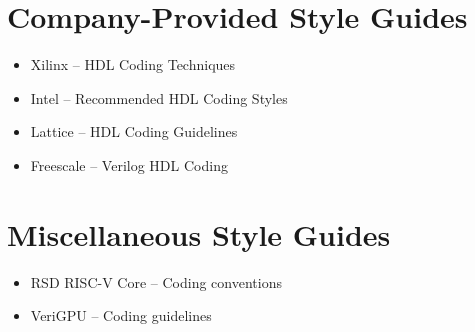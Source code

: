 \begin{appendices}
\section{Company-Provided Style Guides}

\begin{itemize}
    \item Xilinx -- HDL Coding Techniques \cite{Xilinxstyleguide}
    \item Intel -- Recommended HDL Coding Styles \cite{Intelstyleguide}
    \item Lattice -- HDL Coding Guidelines \cite{Latticestyleguide}
    \item Freescale -- Verilog HDL Coding \cite{Freescalestyleguide}
\end{itemize}

\section{Miscellaneous Style Guides}

\begin{itemize}
    \item RSD RISC-V Core -- Coding conventions \cite{RSDstyleguide}
    \item VeriGPU -- Coding guidelines \cite{VeriGPUstyleguide}
\end{itemize}



\end{appendices}
